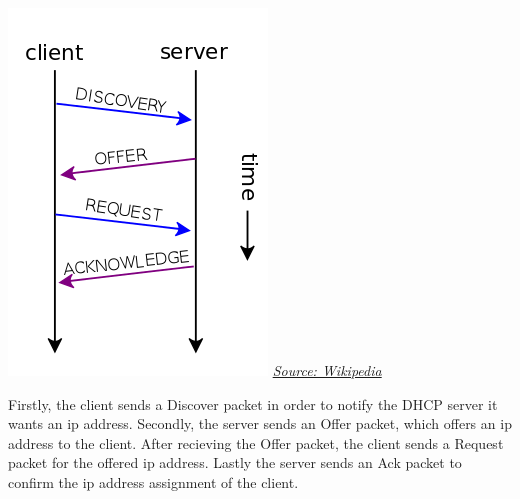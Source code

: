 \includegraphics[scale=0.5]{images/dhcp.png}
\newline
\href{https://en.wikipedia.org/wiki/File:DHCP_session.svg}{\color{red}\textit{Source: Wikipedia}}

Firstly, the client sends a Discover packet in order to notify the DHCP server it wants an ip address. Secondly, the server sends an Offer packet, which offers an ip address to the client. After recieving the Offer packet, the client sends a Request packet for the offered ip address. Lastly the server sends an Ack packet to confirm the ip address assignment of the client.
